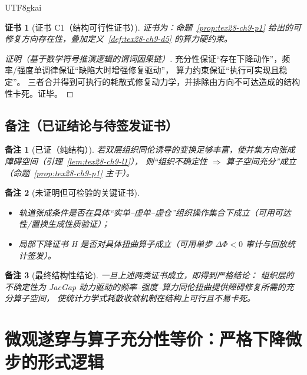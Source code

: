 \documentclass[12pt]{article}
\newtheorem{remark}{备注}[section]
\newtheorem{Certificate}{证书}[section]
\begin{document}
\begin{CJK*}{UTF8}{gkai}
\begin{Certificate}[证书 C1（结构可行性证书）]
\label{cert:tex28-ch9-c1}
证书为：命题~\ref{prop:tex28-ch9-p1} 给出的可修复方向存在性，叠加定义~\ref{def:tex28-ch9-d5} 的算力硬约束。
\end{Certificate}

\begin{proof}[证明（基于数学符号推演逻辑的谓词因果链）]
充分性保证“存在下降动作”，频率/强度单调律保证“缺陷大时增强修复驱动”，
算力约束保证“执行可实现且稳定”。
三者合并得到可执行的耗散式修复动力学，并排除由方向不可达造成的结构性卡死。证毕。
\end{proof}

\subsection{备注（已证结论与待签发证书）}
\label{subsec:tex28-ch9-remarks}

\begin{remark}[已证（纯结构）]
若双层组织同伦诱导的变换足够丰富，使并集方向张成障碍空间（引理~\ref{lem:tex28-ch9-l1}），
则“组织不确定性 $\Rightarrow$ 算子空间充分”成立（命题~\ref{prop:tex28-ch9-p1} 主干）。
\end{remark}

\begin{remark}[未证明但可检验的关键证书]
\begin{itemize}
  \item 轨道张成条件是否在具体“实单--虚单--虚仓”组织操作集合下成立（可用可达性/置换生成性质验证）；
  \item 局部下降证书 H 是否对具体扭曲算子成立（可用单步 $\Delta\Phi<0$ 审计与回放统计签发）。
\end{itemize}
\end{remark}

\begin{remark}[最终结构性结论]
一旦上述两类证书成立，即得到严格结论：
组织层的不确定性为 JacGap 动力驱动的频率--强度--算力同伦扭曲提供障碍修复所需的充分算子空间，
使统计力学式耗散收敛机制在结构上可行且不易卡死。
\end{remark}

\clearpage

\section{微观遂穿与算子充分性等价：严格下降微步的形式逻辑}
\label{sec:tex28-ch10}


\end{CJK*}
\end{document}
